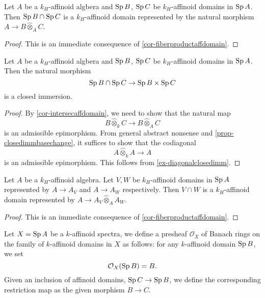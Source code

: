 \begin{corollary}\label{cor-intersecaffdomain}
    Let $A$ be a $k_H$-affinoid algbera and $\operatorname{Sp} B$, $\operatorname{Sp} C$ be $k_H$-affinoid domains in $\operatorname{Sp} A$. Then $\operatorname{Sp} B\cap \operatorname{Sp} C$ is a $k_H$-affinoid domain represented by the natural morphism $A\rightarrow B\hat{\otimes}_A C$.
\end{corollary}
\begin{proof}
    This is an immediate consequence of \cref{cor-fiberproductaffdomain}.
\end{proof}

\begin{corollary}\label{cor-spcatclosedimm}
    Let $A$ be a $k_H$-affinoid algbera and $\operatorname{Sp} B$, $\operatorname{Sp} C$ be $k_H$-affinoid domains in $\operatorname{Sp} A$. Then the natural morphism
    \[
        \operatorname{Sp} B\cap \operatorname{Sp} C\rightarrow \operatorname{Sp} B\times \operatorname{Sp} C  
    \]
    is a closed immersion.
\end{corollary}
\begin{proof}
    By \cref{cor-intersecaffdomain}, we need to show that the natural map
    \[
        B\hat{\otimes}_k C\rightarrow   B\hat{\otimes}_A C
    \]
    is an admissible epimorphism. From general abstract nonsense and \cref{prop-closedimmbasechange}, it suffices to show that the codiagonal 
    \[
        A\hat{\otimes}_k A\rightarrow A  
    \]is 
    an admissible epimorphism. This follows from \cref{ex-diagonalclosedimm}.
\end{proof}

\begin{corollary}\label{cor-affdomainquotient}
    Let $A$ be a $k_H$-affinoid algebra. Let $V,W$ be $k_H$-affinoid domains in $\operatorname{Sp} A$ represented by $A\rightarrow A_V$ and $A\rightarrow A_W$ respectively. Then $V\cap W$ is a $k_H$-affinoid domain represented by $A\rightarrow A_V\hat{\otimes}_A A_W$.
\end{corollary}
\begin{proof}
    This is an immediate consequence of \cref{cor-fiberproductaffdomain}.
    \iffalse
    Observe that $A_V\hat{\otimes}_A A_W$ is $k_H$-affinoid by \cref{prop-existfiberprod}.
    We verify the universal property: let $\Sp B\rightarrow \Sp A$ be a morphism that factors through $V\cap W$, then from the universal properties of $V$ and $W$, we find morphisms $A_V\rightarrow B$ and $A_W\rightarrow B$, both being $A$-linear. So we obtain an induced morphism $A_V\hat{\otimes}_A A_W\rightarrow B$. The morphism is clearly unique.
\fi
\end{proof}

\begin{definition}\label{def-presheafOX}
   Let $X=\operatorname{Sp} A$ be a $k$-affinoid spectra, we define a presheaf $\mathcal{O}_X$ of Banach rings on the family of $k$-affinoid domains in $X$ as follows: for any $k$-affinoid domain $\operatorname{Sp} B$, we set
   \[
        \mathcal{O}_X(\operatorname{Sp} B)=B.
   \]
   Given an inclusion of affinoid domains, $\operatorname{Sp} C\rightarrow \operatorname{Sp} B$, we define the corresponding restriction map as the given morphism $B\rightarrow C$.
\end{definition}

